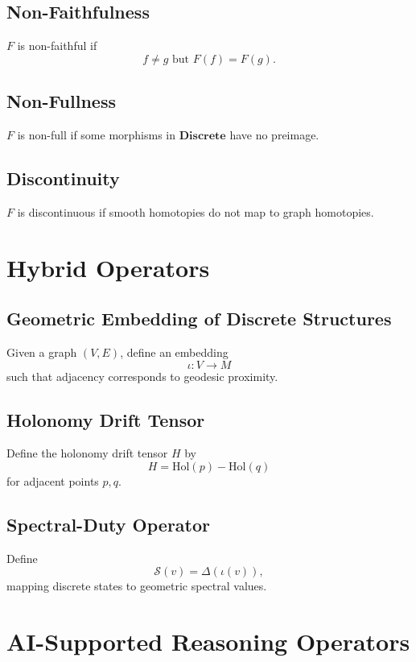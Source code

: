 \documentclass[12pt]{article}
\begin{document}
\subsection{Non-Faithfulness}
$F$ is non-faithful if
\[
f \neq g \text{ but } F(f) = F(g).
\]

\subsection{Non-Fullness}
$F$ is non-full if some morphisms in $\mathbf{Discrete}$ have no preimage.

\subsection{Discontinuity}
$F$ is discontinuous if smooth homotopies do not map to graph homotopies.


\section{Hybrid Operators}

\subsection{Geometric Embedding of Discrete Structures}
Given a graph $(V,E)$, define an embedding
\[
\iota : V \to M
\]
such that adjacency corresponds to geodesic proximity.

\subsection{Holonomy Drift Tensor}
Define the holonomy drift tensor $H$ by
\[
H = \mathrm{Hol}(p) - \mathrm{Hol}(q)
\]
for adjacent points $p,q$.

\subsection{Spectral-Duty Operator}
Define
\[
\mathcal{S}(v) = \Delta(\iota(v)),
\]
mapping discrete states to geometric spectral values.


\section{AI-Supported Reasoning Operators}
\end{document}
